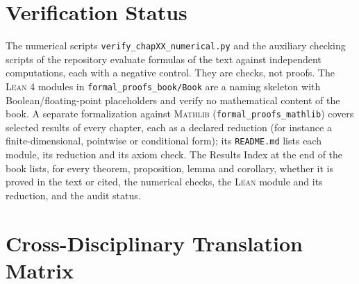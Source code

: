 \documentclass[11pt,a4paper,oneside]{article}
\begin{document}
\clearpage

\section{Verification Status}

The numerical scripts \texttt{verify\_chapXX\_numerical.py} and the auxiliary checking scripts of the repository evaluate formulas of the text against independent computations, each with a negative control. They are checks, not proofs. The \textsc{Lean 4} modules in \texttt{formal\_proofs\_book/Book} are a naming skeleton with Boolean/floating-point placeholders and verify no mathematical content of the book. A separate formalization against \textsc{Mathlib} (\texttt{formal\_proofs\_mathlib}) covers selected results of every chapter, each as a declared reduction (for instance a finite-dimensional, pointwise or conditional form); its \texttt{README.md} lists each module, its reduction and its axiom check. The Results Index at the end of the book lists, for every theorem, proposition, lemma and corollary, whether it is proved in the text or cited, the numerical checks, the \textsc{Lean} module and its reduction, and the audit status.

\section{Cross-Disciplinary Translation Matrix}
\end{document}
